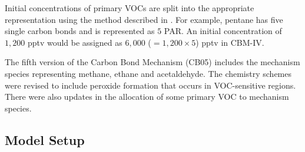 Initial concentrations of primary VOCs are split into the appropriate representation using the method described in \citet{Hogo:1989}. 
For example, pentane has five single carbon bonds and is represented as $5$ PAR. 
An initial concentration of $1,200$ pptv would be assigned as $6,000$ ($= 1,200 \times 5$) pptv in CBM-IV.

The fifth version of the Carbon Bond Mechanism (CB05) \citep{Yarwood:2005} includes the mechanism species representing methane, ethane and acetaldehyde. 
The chemistry schemes were revised to include peroxide formation that occurs in VOC-sensitive regions. 
There were also updates in the allocation of some primary VOC to mechanism species.

\subsection{Model Setup} \label{ss:model_setup}

